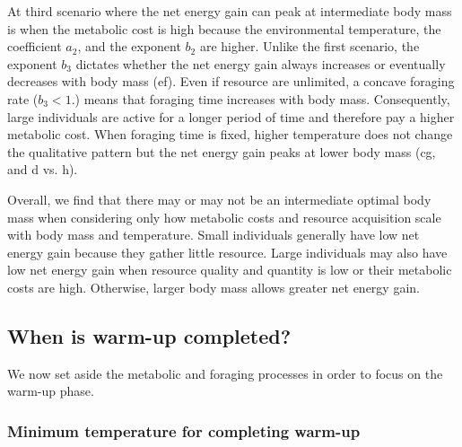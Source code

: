 At third scenario where the net energy gain can peak at intermediate body mass is when the metabolic cost is high because the environmental temperature, the coefficient $a_2$, and the exponent $b_2$ are higher.
Unlike the first scenario, the exponent $b_3$ dictates whether the net energy gain always increases or eventually decreases with body mass (ef).
Even if resource are unlimited, a concave foraging rate ($b_3 < 1.$) means that foraging time increases with body mass.
Consequently, large individuals are active for a longer period of time and therefore pay a higher metabolic cost.
When foraging time is fixed, higher temperature does not change the qualitative pattern but the net energy gain peaks at lower body mass (cg, and d vs. h).

Overall, we find that there may or may not be an intermediate optimal body mass when considering only how metabolic costs and resource acquisition scale with body mass and temperature.
Small individuals generally have low net energy gain because they gather little resource. %
Large individuals may also have low net energy gain when resource quality and quantity is low or their metabolic costs are high.
Otherwise, larger body mass allows greater net energy gain.


\subsection*{When is warm-up completed?}

We now set aside the metabolic and foraging processes in order to focus on the warm-up phase.

\subsubsection*{Minimum temperature for completing warm-up}

